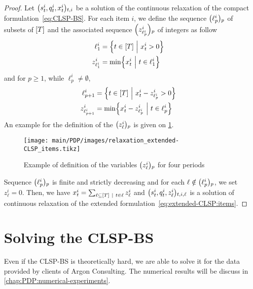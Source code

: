 \begin{proof}
Let $\bracket{\inventory_t^i, \quantity_t^i, \setup_t^i}_{t,i}$ be a solution of the continuous relaxation of the compact formulation~\eqref{eq:CLSP-BS}. For each item $i$, we define the sequence $\bracket{\ell_p^i}_p$ of subsets of $\range{\horizon}$ and the associated sequence $\bracket{z_{\ell_p^i}^i}_p$ of integers as follow
\begin{equation}
  \begin{aligned}
  \ell_1^i       &= \crbracket{t\in\range{\horizon}~\Big|~\setup_t^i>0} \\
  z_{\ell_1^i}^i &= \min\crbracket{\setup_t^i~\Big|~t\in\ell_1^i}
  \end{aligned}
\end{equation}
and for $p\ge1$, while $\ell_p^i\ne\emptyset$,
\begin{equation}
  \begin{aligned}
  \ell_{p+1}^i       &= \crbracket{t\in\range{\horizon}~\Big|~\setup_t^i-z_{\ell_p^i}^i>0} \\
  z_{\ell_{p+1}^i}^i &= \min\crbracket{\setup_t^i-z_{\ell_p^i}^i~\Big|~t\in\ell_p^i}
  \end{aligned}
\end{equation}
An example for the definition of the $\bracket{z_{\ell}^i}_p$ is given on \cref{fig:relaxation-extended-formulation-by-reference}.

\begin{figure}[h]
  \centering
  \texttt{[image: main/PDP/images/relaxation\_extended-CLSP\_items.tikz]}
  \caption{Example of definition of the variables $\bracket{z_{\ell}^i}_p$ for four periods}
  \label{fig:relaxation-extended-formulation-by-reference}
\end{figure}

Sequence $\bracket{\ell_p^i}_p$ is finite and strictly decreasing and for each $\ell\notin\bracket{\ell_p^i}_p$, we set $z_{\ell}^i=0$. Then, we have $\setup_t^i = \sum_{\ell\subseteq\range{\horizon}~|~t\in\ell} z_{\ell}^i$ and $\bracket{\inventory_t^i, \quantity_t^i, z_{\ell}^i}_{t,i,\ell}$ is a solution of continuous relaxation of the extended formulation~\eqref{eq:extended-CLSP:items}.
\end{proof}




\section{Solving the CLSP-BS}
\label{sec:PDP:deterministic:solving}

Even if the CLSP-BS is theoretically hard, we are able to solve it for the data provided by clients of Argon Consulting. The numerical results will be discuss in \cref{chap:PDP:numerical-experiments}.


